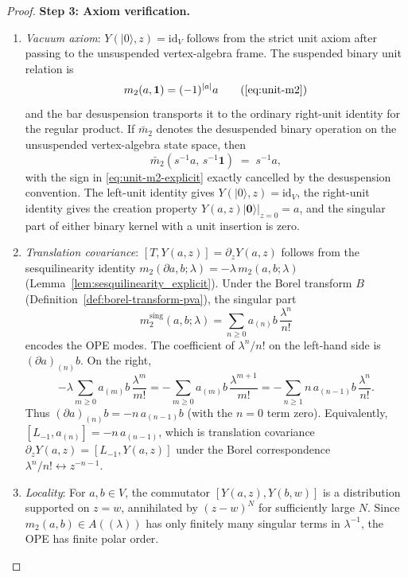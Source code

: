 \begin{proof}
\medskip\noindent\textbf{Step 3: Axiom verification.}
\begin{enumerate}[label=(\roman*)]
\item \emph{Vacuum axiom}: $Y(|0\rangle, z) = \mathrm{id}_V$ follows
from the strict unit axiom after passing to the unsuspended
vertex-algebra frame.  The suspended binary unit relation is
\begin{equation}\label{eq:unit-m2-explicit}
 m_2(a,\mathbf{1}) = (-1)^{|a|}a
 \tag{\ref{eq:unit-m2}}
\end{equation}
and the bar desuspension transports it to the ordinary right-unit
identity for the regular product.  If \(\bar m_2\) denotes the
desuspended binary operation on the unsuspended vertex-algebra state
space, then
\[
 \bar{m}_2(s^{-1}a,\, s^{-1}\mathbf{1})
 \;=\; s^{-1}a,
\]
with the sign in \eqref{eq:unit-m2-explicit} exactly cancelled by the
desuspension convention.  The left-unit identity gives
\(Y(|0\rangle,z)=\mathrm{id}_V\), the right-unit identity gives the
creation property \(Y(a,z)|\mathbf 0\rangle\big|_{z=0}=a\), and the
singular part of either binary kernel with a unit insertion is zero.

\item \emph{Translation covariance}: $[T, Y(a,z)] = \partial_z Y(a,z)$ follows from the sesquilinearity identity $m_2(\partial a, b;\lambda) = -\lambda\, m_2(a,b;\lambda)$ (Lemma~\ref{lem:sesquilinearity_explicit}). Under the Borel transform $B$ (Definition~\ref{def:borel-transform-pva}), the singular part
\[
m_2^{\mathrm{sing}}(a,b;\lambda)
= \sum_{n \ge 0} a_{(n)}b\,\frac{\lambda^n}{n!}
\]
encodes the OPE modes. The coefficient of $\lambda^n/n!$ on the
left-hand side is $(\partial a)_{(n)}b$. On the right,
\[
-\lambda\sum_{m\ge0}a_{(m)}b\,\frac{\lambda^m}{m!}
=-\sum_{m\ge0}a_{(m)}b\,\frac{\lambda^{m+1}}{m!}
=-\sum_{n\ge1}n\,a_{(n-1)}b\,\frac{\lambda^n}{n!}.
\]
Thus $(\partial a)_{(n)}b=-n\,a_{(n-1)}b$ (with the $n=0$ term
zero). Equivalently, $[L_{-1}, a_{(n)}] = -n\, a_{(n-1)}$, which is
translation covariance $\partial_z Y(a,z) = [L_{-1}, Y(a,z)]$ under
the Borel correspondence $\lambda^n/n! \leftrightarrow z^{-n-1}$.

\item \emph{Locality}: For $a,b\in V$, the commutator $[Y(a,z), Y(b,w)]$ is a distribution supported on $z=w$, annihilated by $(z-w)^N$ for sufficiently large $N$. Since $m_2(a,b)\in A((\lambda))$ has only finitely many singular terms in $\lambda^{-1}$, the OPE has finite polar order.


\end{enumerate}
\end{proof}
